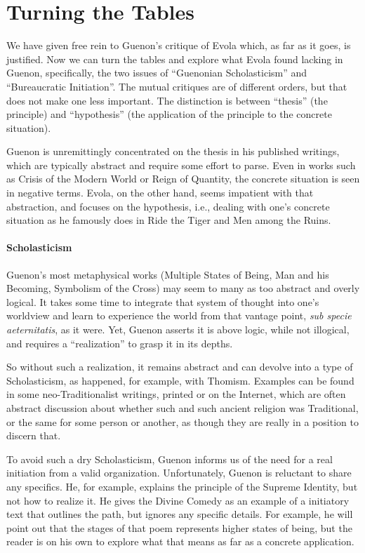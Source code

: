 \section{Turning the Tables}

We have given free rein to Guenon's critique of Evola which, as far as it goes, is justified. Now we can turn the tables and explore what Evola found lacking in Guenon, specifically, the two issues of ``Guenonian Scholasticism'' and ``Bureaucratic Initiation''. The mutual critiques are of different orders, but that does not make one less important. The distinction is between ``thesis'' (the principle) and ``hypothesis'' (the application of the principle to the concrete situation).

Guenon is unremittingly concentrated on the thesis in his published writings, which are typically abstract and require some effort to parse. Even in works such as Crisis of the Modern World or Reign of Quantity, the concrete situation is seen in negative terms. Evola, on the other hand, seems impatient with that abstraction, and focuses on the hypothesis, i.e., dealing with one's concrete situation as he famously does in Ride the Tiger and Men among the Ruins.

\paragraph{Scholasticism}


Guenon's most metaphysical works (Multiple States of Being, Man and his Becoming, Symbolism of the Cross) may seem to many as too abstract and overly logical. It takes some time to integrate that system of thought into one's worldview and learn to experience the world from that vantage point, \emph{sub specie aeternitatis}, as it were. Yet, Guenon asserts it is above logic, while not illogical, and requires a ``realization'' to grasp it in its depths.

So without such a realization, it remains abstract and can devolve into a type of Scholasticism, as happened, for example, with Thomism. Examples can be found in some neo-Traditionalist writings, printed or on the Internet, which are often abstract discussion about whether such and such ancient religion was Traditional, or the same for some person or another, as though they are really in a position to discern that.

To avoid such a dry Scholasticism, Guenon informs us of the need for a real initiation from a valid organization. Unfortunately, Guenon is reluctant to share any specifics. He, for example, explains the principle of the Supreme Identity, but not how to realize it. He gives the Divine Comedy as an example of a initiatory text that outlines the path, but ignores any specific details. For example, he will point out that the stages of that poem represents higher states of being, but the reader is on his own to explore what that means as far as a concrete application.

